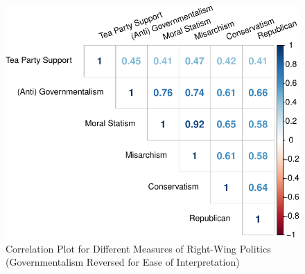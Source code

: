 \documentclass[12pt,]{article}
\begin{document}
\begin{figure}[htbp]
\centering
\includegraphics{figures/corrplot2-1.pdf}
\caption{Correlation Plot for Different Measures of Right-Wing Politics
(Governmentalism Reversed for Ease of Interpretation)}
\end{figure}

\clearpage
\end{document}

